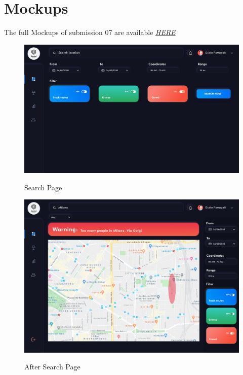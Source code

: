 \documentclass[../main.tex]{subfiles}
\begin{document}
    \section{Mockups}
    The full Mockups of submission 07 are available \href{https://invis.io/P3X4WSWR7JS#/417983015_Homepage}{\textit{HERE}}
    \begin{figure}[H]
        \centering
        \includegraphics[scale = 0.6]{assets/mockups/mock_search.png}\\
        \caption[]{Search Page}\label{fig:figure}
    \end{figure}
    \begin{figure}[H]
        \centering
        \includegraphics[scale = 0.6]{assets/mockups/mock_aftersearch.png}\\
        \caption[]{After Search Page}\label{fig:figure2}
    \end{figure}
    \newpage
\end{document}
